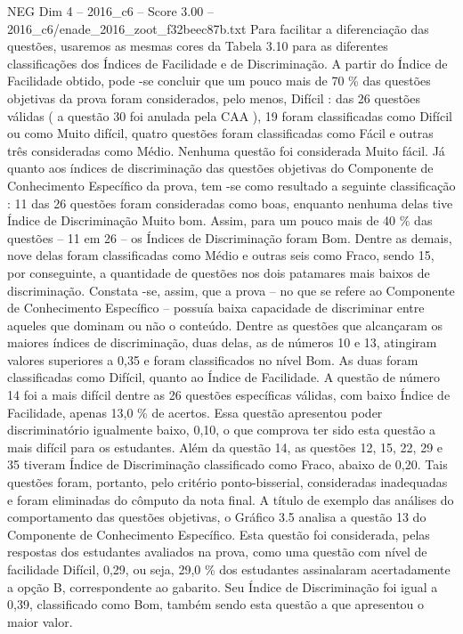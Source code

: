 \begin{textsample}{NEG Dim 4 – 2016\_c6 – Score 3.00 – 2016\_c6/enade\_2016\_zoot\_f32beec87b.txt}
Para facilitar a diferenciação das questões, usaremos as mesmas cores da Tabela 3.10 para as diferentes classificações dos Índices de Facilidade e de Discriminação.
A partir do Índice de Facilidade obtido, pode -se concluir que um pouco mais de 70 \% das questões objetivas da prova foram considerados, pelo menos, Difícil : das 26 questões válidas ( a questão 30 foi anulada pela CAA ), 19 foram classificadas como Difícil ou como Muito difícil, quatro questões foram classificadas como Fácil e outras três consideradas como Médio.
Nenhuma questão foi considerada Muito fácil.
Já quanto aos índices de discriminação das questões objetivas do Componente de Conhecimento Específico da prova, tem -se como resultado a seguinte classificação : 11 das 26 questões foram consideradas como boas, enquanto nenhuma delas tive Índice de Discriminação Muito bom.
Assim, para um pouco mais de 40 \% das questões – 11 em 26 – os Índices de Discriminação foram Bom.
Dentre as demais, nove delas foram classificadas como Médio e outras seis como Fraco, sendo 15, por conseguinte, a quantidade de questões nos dois patamares mais baixos de discriminação.
Constata -se, assim, que a prova – no que se refere ao Componente de Conhecimento Específico – possuía baixa capacidade de discriminar entre aqueles que dominam ou não o conteúdo.
Dentre as questões que alcançaram os maiores índices de discriminação, duas delas, as de números 10 e 13, atingiram valores superiores a 0,35 e foram classificados no nível Bom.
As duas foram classificadas como Difícil, quanto ao Índice de Facilidade.
A questão de número 14 foi a mais difícil dentre as 26 questões específicas válidas, com baixo Índice de Facilidade, apenas 13,0 \% de acertos.
Essa questão apresentou poder discriminatório igualmente baixo, 0,10, o que comprova ter sido esta questão a mais difícil para os estudantes.
Além da questão 14, as questões 12, 15, 22, 29 e 35 tiveram Índice de Discriminação classificado como Fraco, abaixo de 0,20.
Tais questões foram, portanto, pelo critério ponto-bisserial, consideradas inadequadas e foram eliminadas do cômputo da nota final.
A título de exemplo das análises do comportamento das questões objetivas, o Gráfico 3.5 analisa a questão 13 do Componente de Conhecimento Específico.
Esta questão foi considerada, pelas respostas dos estudantes avaliados na prova, como uma questão com nível de facilidade Difícil, 0,29, ou seja, 29,0 \% dos estudantes assinalaram acertadamente a opção B, correspondente ao gabarito.
Seu Índice de Discriminação foi igual a 0,39, classificado como Bom, também sendo esta questão a que apresentou o maior valor.

\end{textsample}
